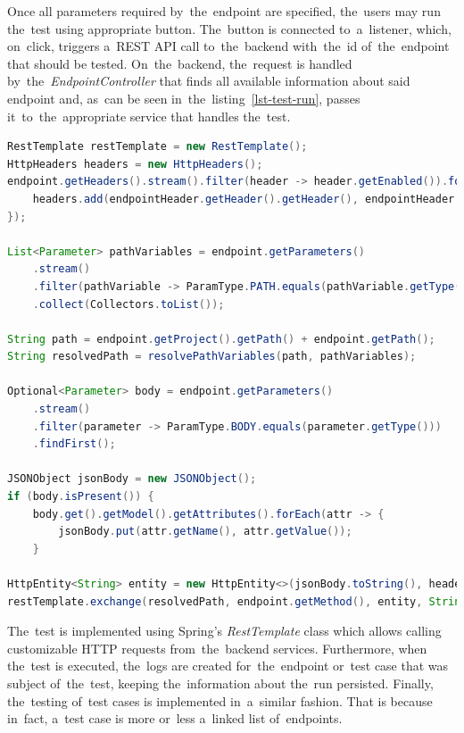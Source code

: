 Once all parameters required by~the~endpoint are specified, the~users may run the~test using appropriate button.
The~button is connected to~a~listener, which, on~click, triggers a~REST API call to~the~backend with~the~id of~the~endpoint
that should be tested. On~the~backend, the~request is handled by~the~\textit{EndpointController} that
finds all available information about said endpoint and, as~can be seen in~the~listing~\ref{lst-test-run}, passes it~to~the~appropriate service that handles the~test.

\vspace{1mm}
\begin{lstlisting}[caption=The~implementation of~a~test run in~backend's service.,
style=dp-default, language=Java, label=lst-test-run]
RestTemplate restTemplate = new RestTemplate();
HttpHeaders headers = new HttpHeaders();
endpoint.getHeaders().stream().filter(header -> header.getEnabled()).forEach(endpointHeader -> {
	headers.add(endpointHeader.getHeader().getHeader(), endpointHeader.getHeader().getValue());
});

List<Parameter> pathVariables = endpoint.getParameters()
	.stream()
    .filter(pathVariable -> ParamType.PATH.equals(pathVariable.getType()))
    .collect(Collectors.toList());

String path = endpoint.getProject().getPath() + endpoint.getPath();
String resolvedPath = resolvePathVariables(path, pathVariables);
            
Optional<Parameter> body = endpoint.getParameters()
	.stream()
	.filter(parameter -> ParamType.BODY.equals(parameter.getType()))
	.findFirst();
    
JSONObject jsonBody = new JSONObject();
if (body.isPresent()) {
	body.get().getModel().getAttributes().forEach(attr -> {
		jsonBody.put(attr.getName(), attr.getValue());
	}
            
HttpEntity<String> entity = new HttpEntity<>(jsonBody.toString(), headers);
restTemplate.exchange(resolvedPath, endpoint.getMethod(), entity, String.class);
\end{lstlisting}

The~test is implemented using Spring's \textit{RestTemplate} class which allows calling customizable HTTP requests from~the~backend
services. Furthermore, when the~test is executed, the~logs are created for~the~endpoint or~test case
that was subject of~the~test, keeping the~information about the~run persisted. Finally, the~testing of~test cases is implemented in~a~similar fashion.
That is because in~fact, a~test case is more or~less a~linked list of~endpoints.

